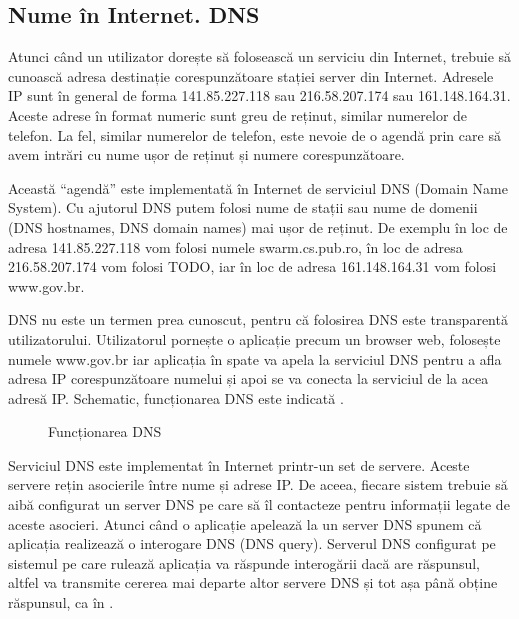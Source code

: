 \subsection{Nume în Internet. DNS}
\label{sec:net:dns}

Atunci când un utilizator dorește să folosească un serviciu din Internet, trebuie să cunoască adresa destinație corespunzătoare stației server din Internet. Adresele IP sunt în general de forma 141.85.227.118 sau 216.58.207.174 sau 161.148.164.31. Aceste adrese în format numeric sunt greu de reținut, similar numerelor de telefon. La fel, similar numerelor de telefon, este nevoie de o agendă prin care să avem intrări cu nume ușor de reținut și numere corespunzătoare.

Această “agendă” este implementată în Internet de serviciul DNS (Domain Name System). Cu ajutorul DNS putem folosi nume de stații sau nume de domenii (DNS hostnames, DNS domain names) mai ușor de reținut. De exemplu în loc de adresa 141.85.227.118 vom folosi numele swarm.cs.pub.ro, în loc de adresa 216.58.207.174 vom folosi TODO, iar în loc de adresa 161.148.164.31 vom folosi www.gov.br.

DNS nu este un termen prea cunoscut, pentru că folosirea DNS este transparentă utilizatorului. Utilizatorul pornește o aplicație precum un browser web, folosește numele www.gov.br iar aplicația în spate va apela la serviciul DNS pentru a afla adresa IP corespunzătoare numelui și apoi se va conecta la serviciul de la acea adresă IP. Schematic, funcționarea DNS este indicată .

\begin{figure}[htbp]
  \centering
  \def\svgwidth{\columnwidth}
  
  \caption{Funcționarea DNS}
  \label{fig:net:dns}
\end{figure}

Serviciul DNS este implementat în Internet printr-un set de servere. Aceste servere rețin asocierile între nume și adrese IP. De aceea, fiecare sistem trebuie să aibă configurat un server DNS pe care să îl contacteze pentru informații legate de aceste asocieri. Atunci când o aplicație apelează la un server DNS spunem că aplicația realizează o interogare DNS (DNS query). Serverul DNS configurat pe sistemul pe care rulează aplicația va răspunde interogării dacă are răspunsul, altfel va transmite cererea mai departe altor servere DNS și tot așa până obține răspunsul, ca în .

